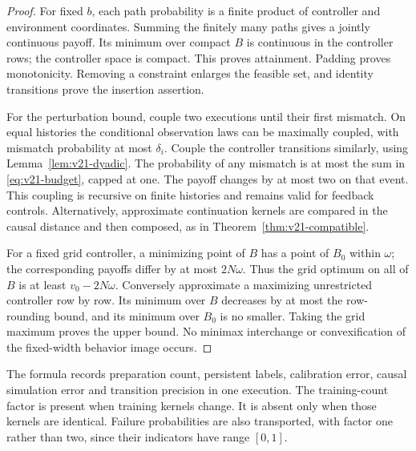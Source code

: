 \begin{proof}
For fixed $b$, each path probability is a finite product of controller
and environment coordinates. Summing the finitely many paths gives a
jointly continuous payoff. Its minimum over compact $B$ is continuous
in the controller rows; the controller space is compact. This proves
attainment. Padding proves monotonicity. Removing a constraint enlarges
the feasible set, and identity transitions prove the insertion assertion.

For the perturbation bound, couple two executions until their first
mismatch. On equal histories the conditional observation laws can be
maximally coupled, with mismatch probability at most $\delta_i$.
Couple the controller transitions similarly, using
Lemma~\ref{lem:v21-dyadic}. The probability of any mismatch is at most
the sum in \eqref{eq:v21-budget}, capped at one. The payoff changes by
at most two on that event. This coupling is recursive on finite histories
and remains valid for feedback controls. Alternatively, approximate
continuation kernels are compared in the causal distance and then
composed, as in Theorem~\ref{thm:v21-compatible}.

For a fixed grid controller, a minimizing point of $B$ has a point of
$B_0$ within $\omega$; the corresponding payoffs differ by at most
$2N\omega$. Thus the grid optimum on all of $B$ is at least
$v_0-2N\omega$. Conversely approximate a maximizing unrestricted
controller row by row. Its minimum over $B$ decreases by at most the
row-rounding bound, and its minimum over $B_0$ is no smaller. Taking the
grid maximum proves the upper bound. No minimax interchange or
convexification of the fixed-width behavior image occurs.
\end{proof}

The formula records preparation count, persistent labels, calibration
error, causal simulation error and transition precision in one execution.
The training-count factor is present when training kernels change. It
is absent only when those kernels are identical. Failure probabilities
are also transported, with factor one rather than two, since their
indicators have range $[0,1]$.

